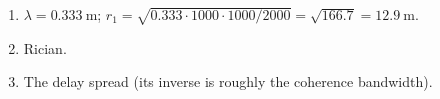 \begin{enumerate}[leftmargin=1.6em,itemsep=2pt]
\item $\lambda = 0.333\ \text{m}$; $r_1 = \sqrt{0.333\cdot1000\cdot1000/2000} = \sqrt{166.7} = 12.9\ \text{m}$.
\item Rician.
\item The delay spread (its inverse is roughly the coherence bandwidth).
\end{enumerate}
